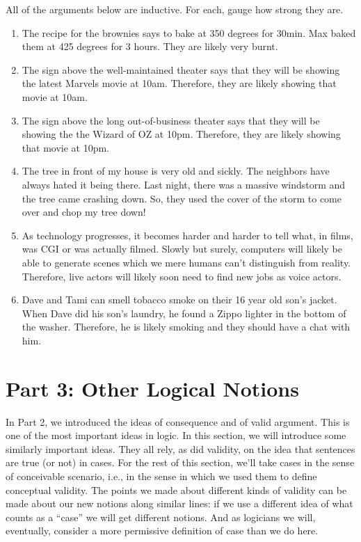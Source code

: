 \problempart
\label{pr.strength}
All of the arguments below are inductive. For each, gauge how strong they are.
\begin{enumerate}
\item The recipe for the brownies says to bake at 350 degrees for 30min. Max baked them at 425 degrees for 3 hours. They are likely very burnt.
\item The sign above the well-maintained theater says that they will be showing the latest Marvels movie at 10am. Therefore, they are likely showing that movie at 10am.
\item The sign above the long out-of-business theater says that they will be showing the the Wizard of OZ at 10pm. Therefore, they are likely showing that movie at 10pm. 
\item The tree in front of my house is very old and sickly. The neighbors have always hated it being there. Last night, there was a massive windstorm and the tree came crashing down. So, they used the cover of the storm to come over and chop my tree down!
\item As technology progresses, it becomes harder and harder to tell what, in films, was CGI or was actually filmed. Slowly but surely, computers will likely be able to generate scenes which we mere humans can't distinguish from reality. Therefore, live actors will likely soon need to find new jobs as voice actors.  
\item Dave and Tami can smell tobacco smoke on their 16 year old son's jacket. When Dave did his son's laundry, he found a Zippo lighter in the bottom of the washer. Therefore, he is likely smoking and they should have a chat with him.  
\end{enumerate}

\chapter{Part 3: Other Logical Notions}
In Part 2, we introduced the ideas of consequence and of valid argument. This is one of the most important ideas in logic. In this section, we will introduce some similarly important ideas. They all rely, as did validity, on the idea that sentences are true (or not) in cases. For the rest of this section, we’ll take cases in the sense of conceivable scenario, i.e., in the sense in which we used them to define conceptual validity. The points we made about different kinds of validity can be made about our new notions along similar lines: if we use a different idea of what counts as a “case” we will get different notions. And as logicians we will, eventually, consider a more permissive definition of case than we do here.
